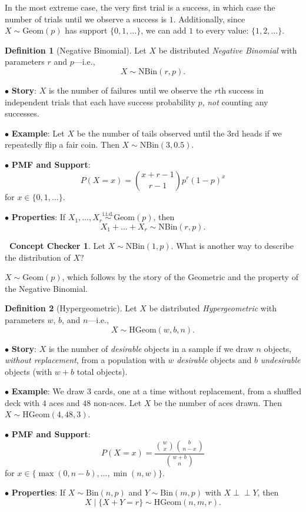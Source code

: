 \documentclass[12pt,oneside]{article}
\newcommand{\indep}{\perp\!\!\!\perp}
\newcommand{\Bin}{\text{Bin}}
\newcommand{\Geom}{\text{Geom}}
\newcommand{\NBin}{\text{NBin}}
\newcommand{\HGeom}{\text{HGeom}}
\newcommand{\simiid}{\overset{\text{i.i.d.}}{\sim}}
\theoremstyle{definition}
\newtheorem{definition}{Definition}
\newtheorem{concept}{\faPen \ Concept Checker}
\theoremstyle{remark}
\begin{document}
\begin{solutionbox}
In the most extreme case, the very first trial is a success, in which case the number of trials until we observe a success is $1$. Additionally, since $X \sim \Geom(p)$ has support $\{0, 1, \ldots\}$, we can add $1$ to every value: $\{1, 2, \ldots\}$.
\end{solutionbox}

\begin{definition}[Negative Binomial]
Let $X$ be distributed \textit{Negative Binomial} with parameters $r$ and $p$—i.e., \[X \sim \NBin(r, p).\]

$\bullet$ \textbf{Story}: $X$ is the number of failures until we observe the $r$th success in independent trials that each have success probability $p$, \textit{not} counting any successes.

$\bullet$ \textbf{Example}: Let $X$ be the number of tails observed until the $3$rd heads if we repeatedly flip a fair coin. Then $X \sim \NBin(3, 0.5)$.

$\bullet$ \textbf{PMF and Support}: \[P(X = x) = \binom{x + r - 1}{r - 1} p^{r} (1 - p)^{x}\] for $x \in \{0, 1, \ldots\}$.

$\bullet$ \textbf{Properties}: If $X_1, \ldots, X_r \simiid \Geom(p)$, then \[X_1 + \ldots + X_r \sim \NBin(r, p).\]
\end{definition}

\begin{concept}
Let $X \sim \NBin(1, p)$. What is another way to describe the distribution of $X$?
\end{concept}

\begin{solutionbox}
$X \sim \Geom(p)$, which follows by the story of the Geometric and the property of the Negative Binomial.
\end{solutionbox}

\begin{definition}[Hypergeometric]
Let $X$ be distributed \textit{Hypergeometric} with parameters $w$, $b$, and $n$—i.e., \[X \sim \HGeom(w, b, n).\]

$\bullet$ \textbf{Story}: $X$ is the number of \textit{desirable} objects in a sample if we draw $n$ objects, \textit{without replacement}, from a population with $w$ \textit{desirable} objects and $b$ \textit{undesirable} objects (with $w + b$ total objects).

$\bullet$ \textbf{Example}: We draw $3$ cards, one at a time without replacement, from a shuffled deck with $4$ aces and $48$ non-aces. Let $X$ be the number of aces drawn. Then $X \sim \HGeom(4, 48, 3)$.

$\bullet$ \textbf{PMF and Support}: \[P(X = x) = \frac{\binom{w}{x} \binom{b}{n - x}}{\binom{w + b}{n}}\] for $x \in \{\max(0, n - b), \ldots, \min(n, w)\}$.

$\bullet$ \textbf{Properties}: If $X \sim \Bin(n, p)$ and $Y \sim \Bin(m, p)$ with $X \indep Y$, then \[X \mid \{X + Y = r\} \sim \HGeom(n, m, r).\]
\end{definition}
\end{document}

